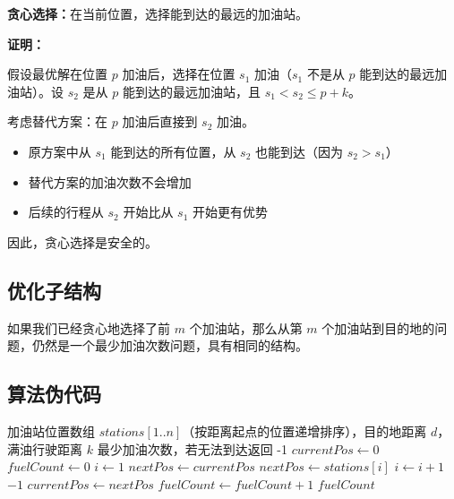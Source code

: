 \documentclass[UTF8,12pt,a4paper]{ctexart}
\begin{document}
\textbf{贪心选择：}在当前位置，选择能到达的最远的加油站。

\textbf{证明：}

假设最优解在位置 $p$ 加油后，选择在位置 $s_1$ 加油（$s_1$ 不是从 $p$ 能到达的最远加油站）。设 $s_2$ 是从 $p$ 能到达的最远加油站，且 $s_1 < s_2 \leq p + k$。

考虑替代方案：在 $p$ 加油后直接到 $s_2$ 加油。
\begin{itemize}
	\item 原方案中从 $s_1$ 能到达的所有位置，从 $s_2$ 也能到达（因为 $s_2 > s_1$）
	\item 替代方案的加油次数不会增加
	\item 后续的行程从 $s_2$ 开始比从 $s_1$ 开始更有优势
\end{itemize}

因此，贪心选择是安全的。

\subsection*{优化子结构}

如果我们已经贪心地选择了前 $m$ 个加油站，那么从第 $m$ 个加油站到目的地的问题，仍然是一个最少加油次数问题，具有相同的结构。

\subsection*{算法伪代码}

\begin{algorithm}[H]
	\caption{最少加油次数贪心算法}
	\begin{algorithmic}[1]
		\Require 加油站位置数组 $stations[1..n]$（按距离起点的位置递增排序），目的地距离 $d$，满油行驶距离 $k$
		\Ensure 最少加油次数，若无法到达返回 -1
		\State $currentPos \gets 0$ 
		\State $fuelCount \gets 0$ 
		\State $i \gets 1$ 
		 
			\State $nextPos \gets currentPos$ 
				\State $nextPos \gets stations[i]$ 
				\State $i \gets i + 1$
			\EndWhile
			 
				\State \Return $-1$ 
			\EndIf
			\State $currentPos \gets nextPos$ 
			\State $fuelCount \gets fuelCount + 1$
		\EndWhile
		\State \Return $fuelCount$
	\end{algorithmic}
\end{algorithm}
\end{document}
